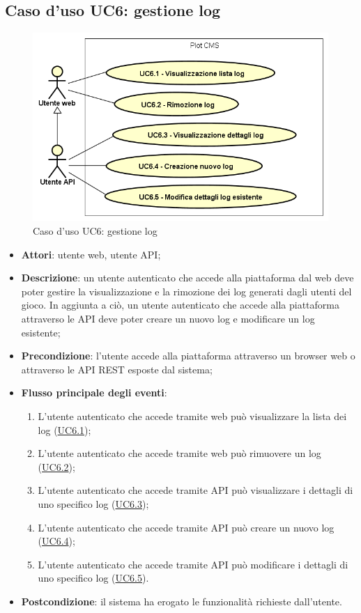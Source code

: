 \subsection{Caso d'uso UC6: gestione log}

        \begin{figure}[H]
            \centering
            \includegraphics[scale=0.95, width=\textwidth]{immagini/usecase/UC6.png}
            \caption{Caso d'uso UC6: gestione log}\label{fig:UC6} 
        \end{figure}
\begin{itemize}
\item \textbf{Attori}: utente web, utente API;
\item \textbf{Descrizione}: un utente autenticato che accede alla piattaforma dal web deve poter gestire la visualizzazione e la rimozione dei log generati dagli utenti del gioco.
In aggiunta a ciò, un utente autenticato che accede alla piattaforma attraverso le API deve poter creare un nuovo log e modificare un log esistente; 
      \item \textbf{Precondizione}: l'utente accede alla piattaforma attraverso un browser web o attraverso le API REST esposte dal sistema;

        \item \textbf{Flusso principale degli eventi}:
          \begin{enumerate}
          \item L'utente autenticato che accede tramite web può visualizzare la lista dei log (\hyperlink{UC6.1}{UC6.1});
          \item L'utente autenticato che accede tramite web può rimuovere un log (\hyperlink{UC6.2}{UC6.2});
          \item L'utente autenticato che accede tramite API può visualizzare i dettagli di uno specifico log (\hyperlink{UC6.3}{UC6.3});
          \item L'utente autenticato che accede tramite API può creare un nuovo log (\hyperlink{UC6.4}{UC6.4});
          \item L'utente autenticato che accede tramite API può modificare i dettagli di uno specifico log (\hyperlink{UC6.5}{UC6.5}).

      \end{enumerate}
    \item \textbf{Postcondizione}: il sistema ha erogato le funzionalità richieste dall'utente.
  \end{itemize}
\hypertarget{UC6.1}{}

